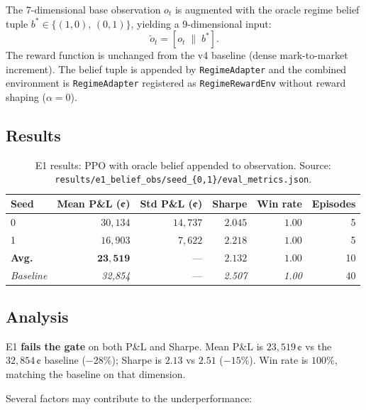 \documentclass[11pt]{article}
\begin{document}
The 7-dimensional base observation $o_t$ is augmented with the oracle regime
belief tuple $b^* \in \{(1,0),\,(0,1)\}$, yielding a 9-dimensional input:
\[
  \tilde{o}_t = [o_t \;\|\; b^*].
\]
The reward function is unchanged from the v4 baseline (dense mark-to-market
increment). The belief tuple is appended by \texttt{RegimeAdapter} and the
combined environment is \texttt{RegimeAdapter} registered as
\texttt{RegimeRewardEnv} without reward shaping ($\alpha=0$).

\subsection{Results}

\begin{table}[H]
\centering
\begin{tabular}{lrrrrr}
\toprule
\textbf{Seed} &
\textbf{Mean P\&L (¢)} &
\textbf{Std P\&L (¢)} &
\textbf{Sharpe} &
\textbf{Win rate} &
\textbf{Episodes} \\
\midrule
0 & $30{,}134$ & $14{,}737$ & $2.045$ & $1.00$ & 5 \\
1 & $16{,}903$ & $\phantom{0}7{,}622$ & $2.218$ & $1.00$ & 5 \\
\midrule
\textbf{Avg.} & $\mathbf{23{,}519}$ & --- & $\mathbf{2.132}$ & $\mathbf{1.00}$ & 10 \\
\midrule
\textit{Baseline} & \textit{32,854} & --- & \textit{2.507} & \textit{1.00} & 40 \\
\bottomrule
\end{tabular}
\caption{E1 results: PPO with oracle belief appended to observation.
         Source: \texttt{results/e1\_belief\_obs/seed\_\{0,1\}/eval\_metrics.json}.}
\label{tab:e1}
\end{table}

\subsection{Analysis}

E1 \textbf{fails the gate} on both P\&L and Sharpe.
Mean P\&L is $23{,}519$\,¢ vs the $32{,}854$\,¢ baseline ($-28\%$);
Sharpe is $2.13$ vs $2.51$ ($-15\%$).
Win rate is $100\%$, matching the baseline on that dimension.

Several factors may contribute to the underperformance:
\end{document}
